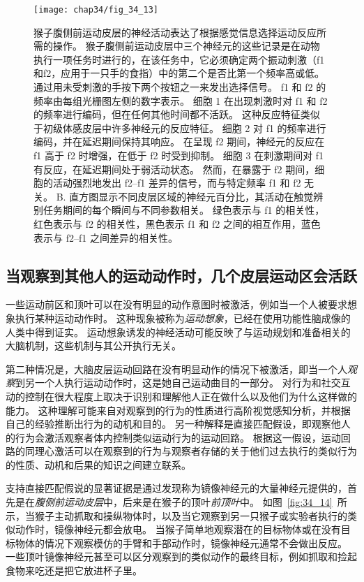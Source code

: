 \begin{figure}[htbp]
	\centering
	\texttt{[image: chap34/fig\_34\_13]}
	\caption{猴子腹侧前运动皮层的神经活动表达了根据感觉信息选择运动反应所需的操作\cite{romo2004neuronal}。
		猴子腹侧前运动皮层中三个神经元的这些记录是在动物执行一项任务时进行的，在该任务中，它必须确定两个振动刺激（f1和f2，应用于一只手的食指）中的第二个是否比第一个频率高或低。
		通过用未受刺激的手按下两个按钮之一来发出选择信号。
		f1 和 f2 的频率由每组光栅图左侧的数字表示。
		细胞 1 在出现刺激时对 f1 和 f2 的频率进行编码，但在任何其他时间都不活跃。
		这种反应特征类似于初级体感皮层中许多神经元的反应特征。
		细胞 2 对 f1 的频率进行编码，并在延迟期间保持其响应。
		在呈现 f2 期间，神经元的反应在 f1 高于 f2 时增强，在低于 f2 时受到抑制。
		细胞 3 在刺激期间对 f1 有反应，在延迟期间处于弱活动状态。
		然而，在暴露于 f2 期间，细胞的活动强烈地发出 f2–f1 差异的信号，而与特定频率 f1 和 f2 无关。
		B. 直方图显示不同皮层区域的神经元百分比，其活动在触觉辨别任务期间的每个瞬间与不同参数相关。
		绿色表示与 f1 的相关性，红色表示与 f2 的相关性，黑色表示 f1 和 f2 之间的相互作用，蓝色表示与 f2–f1 之间差异的相关性。}
	\label{fig:34_13}
\end{figure}



\subsection{当观察到其他人的运动动作时，几个皮层运动区会活跃}

一些运动前区和顶叶可以在没有明显的动作意图时被激活，例如当一个人被要求想象执行某种运动动作时。
这种现象被称为\textit{运动想象}，已经在使用功能性脑成像的人类中得到证实。
运动想象诱发的神经活动可能反映了与运动规划和准备相关的大脑机制，这些机制与其公开执行无关。


第二种情况是，大脑皮层运动回路在没有明显动作的情况下被激活，即当一个人\textit{观察}到另一个人执行运动动作时，这是她自己运动曲目的一部分。
对行为和社交互动的控制在很大程度上取决于识别和理解他人正在做什么以及他们为什么这样做的能力。
这种理解可能来自对观察到的行为的性质进行高阶视觉感知分析，并根据自己的经验推断出行为的动机和目的。
另一种解释是直接匹配假设，即观察他人的行为会激活观察者体内控制类似运动行为的运动回路。
根据这一假设，运动回路的同理心激活可以在观察到的行为与观察者存储的关于他们过去执行的类似行为的性质、动机和后果的知识之间建立联系。


支持直接匹配假说的显著证据是通过发现称为镜像神经元的大量神经元提供的，首先是在\textit{腹侧前运动皮层}中，后来是在猴子的顶叶\textit{前顶叶}中。
如图~\ref{fig:34_14}~所示，当猴子主动抓取和操纵物体时，以及当它观察到另一只猴子或实验者执行的类似动作时，镜像神经元都会放电。
当猴子简单地观察潜在的目标物体或在没有目标物体的情况下观察模仿的手臂和手部动作时，镜像神经元通常不会做出反应。
一些顶叶镜像神经元甚至可以区分观察到的类似动作的最终目标，例如抓取和捡起食物来吃还是把它放进杯子里。


